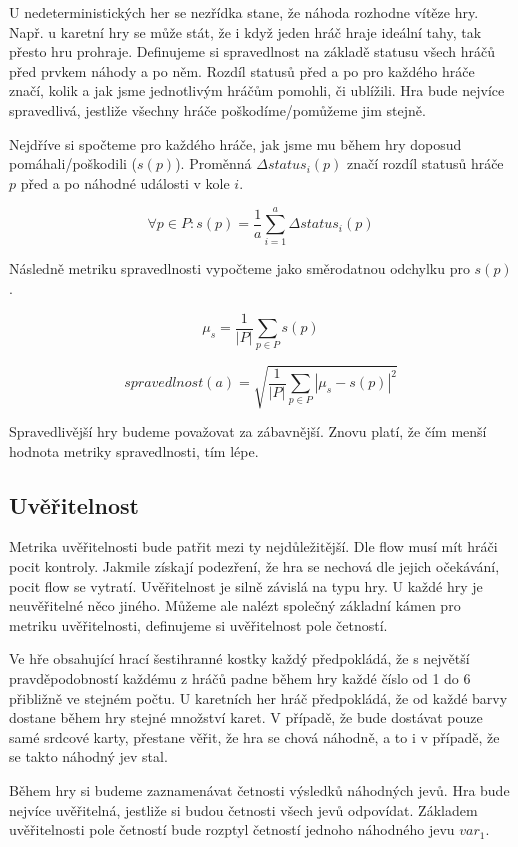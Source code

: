 U nedeterministických her se nezřídka stane, že náhoda rozhodne vítěze hry. Např. u karetní hry se může stát, že i když jeden hráč hraje ideální tahy, tak přesto hru prohraje. Definujeme si spravedlnost na základě statusu všech hráčů před prvkem náhody a po něm. Rozdíl statusů před a po pro každého hráče značí, kolik a jak jsme jednotlivým hráčům pomohli, či ublížili. Hra bude nejvíce spravedlivá, jestliže všechny hráče poškodíme/pomůžeme jim stejně.

Nejdříve si spočteme pro každého hráče, jak jsme mu během hry doposud pomáhali/poškodili ($s(p)$). Proměnná $\Delta status_i(p)$ značí rozdíl statusů hráče $p$ před a po náhodné události v kole $i$.

	\[
	\forall p \in P : s(p) = \frac{1}{a}\sum_{i=1}^a \Delta status_i(p)
\]

Následně metriku spravedlnosti vypočteme jako směrodatnou odchylku pro $s(p)$.

	\[
	\mu_s = \frac{1}{|P|}\sum_{p \in P} s(p)
\]

	\[
	spravedlnost(a) = \sqrt{\frac{1}{|P|}\sum_{p \in P} |\mu_s - s(p)|^2}
\]

Spravedlivější hry budeme považovat za zábavnější. Znovu platí, že čím menší hodnota metriky spravedlnosti, tím lépe.

\subsection{Uvěřitelnost}

Metrika uvěřitelnosti bude patřit mezi ty nejdůležitější. Dle flow musí mít hráči pocit kontroly. Jakmile získají podezření, že hra se nechová dle jejich očekávání, pocit flow se vytratí. Uvěřitelnost je silně závislá na typu hry. U každé hry je neuvěřitelné něco jiného. Můžeme ale nalézt společný základní kámen pro metriku uvěřitelnosti, definujeme si uvěřitelnost pole četností.

Ve hře obsahující hrací šestihranné kostky každý předpokládá, že s největší pravděpodobností každému z hráčů padne během hry každé číslo od 1 do 6 přibližně ve stejném počtu. U karetních her hráč předpokládá, že od každé barvy dostane během hry stejné množství karet. V případě, že bude dostávat pouze samé srdcové karty, přestane věřit, že hra se chová náhodně, a to i v případě, že se takto náhodný jev stal.

Během hry si budeme zaznamenávat četnosti výsledků náhodných jevů. Hra bude nejvíce uvěřitelná, jestliže si budou četnosti všech jevů odpovídat. Základem uvěřitelnosti pole četností bude rozptyl četností jednoho náhodného jevu $var_1$.


